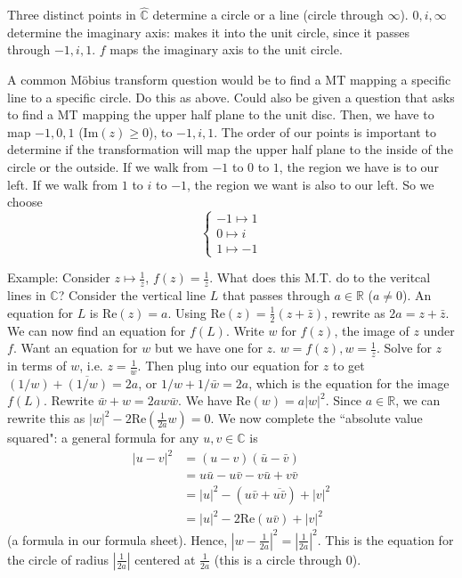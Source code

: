 \documentclass{article}
\theoremstyle{plain}
\theoremstyle{remark}
\newcommand{\R}{{\mathbb R}}
\newcommand{\C}{{\mathbb C}}
\begin{document}
Three distinct points in $\hat{\C}$ determine a circle or a line (circle through $\infty$).
$0,i,\infty$ determine the imaginary axis:
makes it into the unit circle, since it passes through $-1,i,1$.
$f$ maps the imaginary axis to the unit circle.

A common M\"{o}bius transform question would be to find a MT mapping
a specific line to a specific circle.
Do this as above.
Could also be given a question that asks to find a MT mapping
the upper half plane to the unit disc.
Then, we have to map $-1,0,1$ ($\mathrm{Im}(z)\geq0$), to $-1,i,1$.
The order of our points is important to determine
if the transformation will map the upper half plane to the inside
of the circle or the outside.
If we walk from $-1$ to $0$ to $1$, the region we have is to our left.
If we walk from $1$ to $i$ to $-1$, the region we want is also to our left.
So we choose
\[\begin{cases}
	-1 \mapsto 1\\
	0 \mapsto  i\\
	1 \mapsto -1
\end{cases}\]

Example: Consider $z \mapsto \frac{1}{z}$, $f(z) = \frac{1}{z}$.
What does this M.T. do to the veritcal lines in $\C$?
Consider the vertical line $L$ that passes through $a \in \R$ ($a\neq0$).
An equation for $L$ is $\mathrm{Re}(z) = a$.
Using $\mathrm{Re}(z) = \frac{1}{2}(z+\bar{z})$, rewrite as
$2a = z + \bar{z}$.
We can now find an equation for $f(L)$.
Write $w$ for $f(z)$, the image of $z$ under $f$.
Want an equation for $w$ but we have one for $z$.
$w = f(z), w = \frac{1}{z}$.
Solve for $z$ in terms of $w$, i.e. $z = \frac{1}{w}$.
Then plug into our equation for $z$ to get $(1/w) + \overline{(1/w)} = 2a$,
or $1/w + 1/\bar{w} = 2a$, which is the equation for the image $f(L)$.
Rewrite $\bar{w} + w = 2aw\bar{w}$.
We have $\mathrm{Re}(w) = a|w|^2$.
Since $a \in \R$, we can rewrite this as $|w|^2 - 2\mathrm{Re}(\frac{1}{2a}w) = 0$.
We now complete the ``absolute value squared":
a general formula for any $u,v \in \C$ is
\begin{align*}
	|u-v|^2
	&= (u-v)(\bar{u}-\bar{v})\\
	&= u\bar{u} - u\bar{v} - v\bar{u} + v\bar{v}\\
	&= |u|^2 - (u\bar{v} + \overline{u\bar{v}}) + |v|^2\\
	&= |u|^2 - 2\mathrm{Re}(u\bar{v}) + |v|^2
\end{align*}
(a formula in our formula sheet).
Hence, $\left\lvert w - \frac{1}{2a}\right\rvert^2 = \left\lvert \frac{1}{2a}\right\rvert^2$.
This is the equation for the circle of radius $\left\lvert \frac{1}{2a}\right\rvert$
centered at $\frac{1}{2a}$ (this is a circle through $0$).
\end{document}

